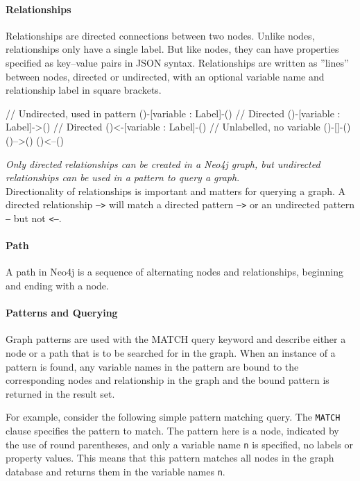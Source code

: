 \paragraph*{Relationships} Relationships are directed connections between two nodes. Unlike nodes, relationships only have a single label. But like nodes, they can have properties specified as key--value pairs in JSON syntax. Relationships are written as ''lines'' between nodes, directed or undirected, with an optional variable name and relationship label in square brackets. 

\begin{cyphercode}
// Undirected, used in pattern
()-[variable : Label]-()  
// Directed 
()-[variable : Label]->() 
// Directed
()<-[variable : Label]-() 
// Unlabelled, no variable
()-[]-()    
()-->()
()<--()
\end{cyphercode}

\begin{tcolorbox}[colback=alert]
\emph{Only directed relationships can be created in a Neo4j graph, but undirected relationships can be used in a pattern to query a graph}. \\

Directionality of relationships is important and matters for querying a graph. A directed relationship \texttt{-->} will match a directed pattern \texttt{-->} or an undirected pattern \texttt{--} but not \texttt{<--}. 
\end{tcolorbox}

\paragraph*{Path}
A path in Neo4j is a sequence of alternating nodes and relationships, beginning and ending with a node.

\paragraph*{Patterns and Querying}

Graph patterns are used with the MATCH query keyword and describe either a node or a path that is to be searched for in the graph. When an instance of a pattern is found, any variable names in the pattern are bound to the corresponding nodes and relationship in the graph and the bound pattern is returned in the result set.

For example, consider the following simple pattern matching query. The \texttt{MATCH} clause specifies the pattern to match. The pattern here is a node, indicated by the use of round parentheses, and only a variable name \texttt{n} is specified, no labels or property values. This means that this pattern matches all nodes in the graph database and returns them in the variable names \texttt{n}.

